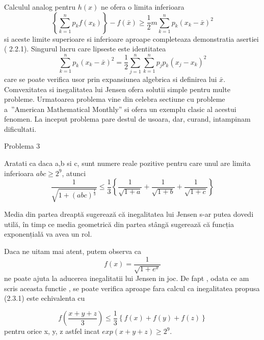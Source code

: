 \documentclass[a4paper,12pt,oneside]{report}
\begin{document}
	Calculul analog pentru  \(h\left ( x \right )\) ne ofera o limita inferioara 
\begin{displaymath}
  \left \{ \sum_{k = 1}^{n} p_{k}f\left ( x_{k} \right )\right \} - f\left (\bar{x}  \right )\geq \frac{1}{2}m\sum_{k = 1}^{n}p_{k}\left ( x_{k} - \bar{x} \right )^{2}
\end{displaymath}
si aceste limite superioare si inferioare aproape completeaza demonstratia asertiei ( 2.2.1). Singurul lucru care lipseste este identitatea 
\begin{displaymath}
  \sum_{k = 1}^{n}p_{k}\left ( x_{k} - \bar{x} \right )^{2} = \frac{1}{2}\sum_{j = 1}^{n}\sum_{k = 1}^{n} p _{j}p_{k}\left ( x_{j} - x_{k} \right )^{2}
\end{displaymath}
care se poate verifica usor prin expansiunea algebrica si definirea lui \(\bar{x}\). 
	Comvexitatea si inegalitatea lui Jensen ofera solutii simple pentru multe probleme.  
	Urmatoarea problema vine din celebra sectiune cu probleme a ”American Mathematical Monthly” si ofera un exemplu clasic al acestui fenomen. 
	La inceput problema pare destul de usoara, dar, curand, intampinam dificultati. 

Problema 3

Aratati ca daca a,b si c, sunt numere reale pozitive pentru care unul are limita inferioara \(abc \geq 2^{9}\), atunci 
\begin{displaymath}
  \frac{1}{\sqrt{1 + \left ( abc \right )^{\frac{1}{3}}}}\leq \frac{1}{3}\left \{ \frac{1}{\sqrt{1 + a}} + \frac{1}{\sqrt{1 + b}} + \frac{1}{\sqrt{1 + c}}\right \}    	\label{eq:2.3.1} \tag{2.3.1}
\end{displaymath}

Media din partea dreaptă sugerează că inegalitatea lui Jensen s-ar putea dovedi utilă, în timp ce media geometrică din partea stângă sugerează că funcția exponențială va avea un rol. 

Daca ne uitam mai atent, putem observa ca 
\begin{displaymath}
  f\left ( x \right ) = \frac{1}{\sqrt{1+ e^{x}}}
\end{displaymath}
ne poate ajuta la aducerea inegalitatii lui Jensen in joc. De fapt , odata ce am scris aceasta functie , se poate verifica aproape fara calcul ca inegalitatea propusa (2.3.1) este echivalenta cu 

\begin{displaymath}
  f\left ( \frac{x + y + z}{3} \right )\leq \frac{1}{3}\left \{ f\left ( x \right ) + f\left ( y \right ) + f\left ( z \right ) \right \}    \label{eq:2.3.2} \tag{2.3.2}
\end{displaymath}
pentru orice x, y, z astfel incat \(exp\left ( x + y + z \right )\geq 2^{9}.\)
\end{document}
